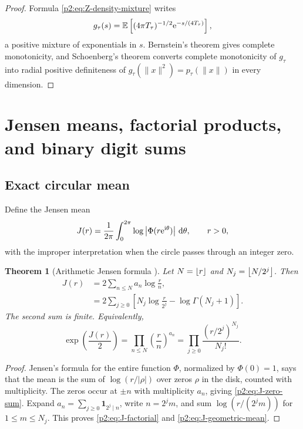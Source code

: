 \documentclass[11pt]{article}
\newtheorem{theorem}{Theorem}[section]
\theoremstyle{definition}
\theoremstyle{remark}
\newcommand{\E}{\mathbb E}
\newcommand{\dd}{\,\mathrm d}
\begin{document}
\begin{proof}
Formula \eqref{p2:eq:Z-density-mixture} writes
\[
 g_\tau(s)=\E\left[(4\pi T_\tau)^{-1/2}
                    \e^{-s/(4T_\tau)}\right],
\]
a positive mixture of exponentials in $s$.  Bernstein's theorem gives complete monotonicity,
and Schoenberg's theorem converts complete monotonicity of $g_\tau$ into radial positive
definiteness of $g_\tau(\|x\|^2)=p_\tau(\|x\|)$ in every dimension.
\end{proof}

\section{Jensen means, factorial products, and binary digit sums}
\label{p2:sec:jensen}

\subsection{Exact circular mean}

Define the Jensen mean
\begin{equation}
 J(r)=\frac1{2\pi}\int_0^{2\pi}
 \log\left|\Phi(r\e^{\ii\theta})\right|\dd\theta,
 \qquad r>0,                                             \label{p2:eq:J-def}
\end{equation}
with the improper interpretation when the circle passes through an integer zero.

\begin{theorem}[Arithmetic Jensen formula \New]
Let $N=\left\lfloor r\right\rfloor$ and $N_j=\left\lfloor N/2^j\right\rfloor$.  Then
\begin{align}
 J(r)
 &=2\sum_{n\le N}a_n\log\frac{r}{n},                     \label{p2:eq:J-zero-sum}\\
 &=2\sum_{j\ge0}
 \left[N_j\log\frac{r}{2^j}-\log\Gamma(N_j+1)\right].   \label{p2:eq:J-factorial}
\end{align}
The second sum is finite.  Equivalently,
\begin{equation}
 \boxed{\quad
 \exp\left(\frac{J(r)}2\right)
 =\prod_{n\le N}\left(\frac{r}{n}\right)^{a_n}
 =\prod_{j\ge0}\frac{(r/2^j)^{N_j}}{N_j!}.
 \quad}                                                  \label{p2:eq:J-geometric-mean}
\end{equation}
\end{theorem}

\begin{proof}
Jensen's formula for the entire function $\Phi$, normalized by $\Phi(0)=1$, says that the
mean is the sum of $\log(r/|\rho|)$ over zeros $\rho$ in the disk, counted with multiplicity.
The zeros occur at $\pm n$ with multiplicity $a_n$, giving \eqref{p2:eq:J-zero-sum}.  Expand
$a_n=\sum_{j\ge0}\mathbf1_{2^j\mid n}$, write $n=2^jm$, and sum
$\log(r/(2^jm))$ for $1\le m\le N_j$.  This proves \eqref{p2:eq:J-factorial} and
\eqref{p2:eq:J-geometric-mean}.
\end{proof}
\end{document}

